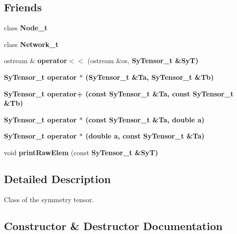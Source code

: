 \subsection*{Friends}
\begin{CompactItemize}
\item 
class \textbf{Node\_\-t}\label{d1/d9f/classSyTensor__t_b2f872a750d8da8e542cda4b32a8bb0f}

\item 
class \textbf{Network\_\-t}\label{d1/d9f/classSyTensor__t_4b7194fbe85c39fb580b5da4a8a17dbc}

\item 
ostream \& \textbf{operator$<$$<$} (ostream \&os, \bf{Sy\-Tensor\_\-t} \&Sy\-T)\label{d1/d9f/classSyTensor__t_0d26ff3dec4ed5280ffa7d24ea076044}

\item 
\bf{Sy\-Tensor\_\-t} \textbf{operator $\ast$} (\bf{Sy\-Tensor\_\-t} \&Ta, \bf{Sy\-Tensor\_\-t} \&Tb)\label{d1/d9f/classSyTensor__t_6cdd7cf942cd4ae2cc1af555c7ea8e39}

\item 
\bf{Sy\-Tensor\_\-t} \textbf{operator+} (const \bf{Sy\-Tensor\_\-t} \&Ta, const \bf{Sy\-Tensor\_\-t} \&Tb)\label{d1/d9f/classSyTensor__t_78053ccd41629928ab04956d15684fed}

\item 
\bf{Sy\-Tensor\_\-t} \textbf{operator $\ast$} (const \bf{Sy\-Tensor\_\-t} \&Ta, double a)\label{d1/d9f/classSyTensor__t_1352523954dbcf7f3a87e1f4357b9d6c}

\item 
\bf{Sy\-Tensor\_\-t} \textbf{operator $\ast$} (double a, const \bf{Sy\-Tensor\_\-t} \&Ta)\label{d1/d9f/classSyTensor__t_71000acd6905314539cbbb8e172d5d6c}

\item 
void \textbf{print\-Raw\-Elem} (const \bf{Sy\-Tensor\_\-t} \&Sy\-T)\label{d1/d9f/classSyTensor__t_0e4415969476c6557f76bf919610023d}

\end{CompactItemize}


\subsection{Detailed Description}
Class of the symmetry tensor. 



\subsection{Constructor \& Destructor Documentation}
